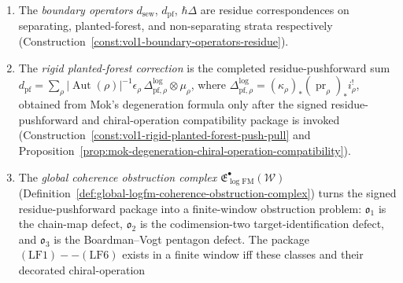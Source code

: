 \begin{summary}
\begin{enumerate}[label=\textup{(\alph*)}]
 and~\ref{const:vol1-graphwise-log-fm-cocomposition}),
 and yields graphwise Taylor coefficients $\ell_k^{(g)} =
 \sum_\Gamma |\operatorname{Aut}(\Gamma)|^{-1}\ell_\Gamma$, with
 the finite automorphism weight fixed by
 Lemma~\ref{lem:finite-groupoid-reynolds-normalisation}. Local nested
 cocompositions satisfy strict SNC coassociativity and pentagon
 coherence by Lemma~\ref{lem:local-nested-log-cocomposition}; the
 global homotopy-coherent extension is part of the signed log-FM
 residue-pushforward package
 (Definition~\ref{def:signed-logfm-residue-pushforward-package};
 Proposition~\ref{prop:homotopy-coherent-logfm-cooperad-package}).
 Theorem~\ref{thm:logfm-homotopy-dg-modular-cooperad} identifies the
 resulting global structure as homotopy dg and uncurved after
 $d_{\mathrm{pf}}$; it also isolates the fixed smooth-curve FM core as
 the zero stable-node/relative-crossing sector. The component degrees,
 filtration effects, graph effects, arity/genus effects, conformal
 filtration effects, and pairwise anticommutators are proved in
 Theorem~\ref{thm:six-component-logfm-d-squared-zero}.
\item The \emph{boundary operators} $d_{\mathrm{sew}}$,
 $d_{\mathrm{pf}}$, $\hbar\Delta$ are residue correspondences on
 separating, planted-forest, and non-separating strata respectively
 (Construction~\ref{const:vol1-boundary-operators-residue}).
\item The \emph{rigid planted-forest correction} is the completed
 residue-pushforward sum
 $d_{\mathrm{pf}} = \sum_\rho
 |\operatorname{Aut}(\rho)|^{-1}\epsilon_\rho\,
 \Delta^{\log}_{\mathrm{pf},\rho}\otimes \mu_\rho$, where
 $\Delta^{\log}_{\mathrm{pf},\rho}
 =(\kappa_\rho)_*(\operatorname{pr}_\rho)_*i_\rho^!$,
 obtained from Mok's degeneration formula only after the signed
 residue-pushforward and chiral-operation compatibility package is
 invoked
 (Construction~\ref{const:vol1-rigid-planted-forest-push-pull} and
 Proposition~\ref{prop:mok-degeneration-chiral-operation-compatibility}).
\item The \emph{global coherence obstruction complex}
 \(\mathfrak E_{\log\mathrm{FM}}^\bullet(\mathcal W)\)
 (Definition~\ref{def:global-logfm-coherence-obstruction-complex})
 turns the signed residue-pushforward package into a finite-window
 obstruction problem: \(\mathfrak o_1\) is the chain-map defect,
 \(\mathfrak o_2\) is the codimension-two target-identification
 defect, and \(\mathfrak o_3\) is the Boardman--Vogt pentagon defect.
 The package \((\mathrm{LF}1)--(\mathrm{LF}6)\) exists in a finite
 window iff these classes and their decorated chiral-operation

\end{enumerate}
\end{summary}
